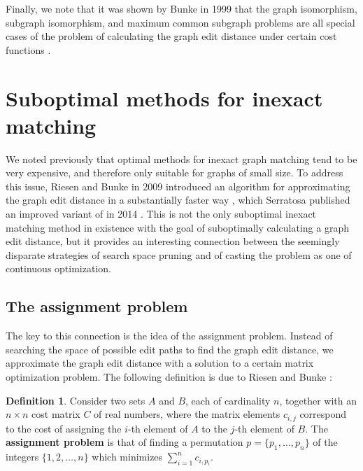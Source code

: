 \documentclass[12pt]{thesis}
\theoremstyle{plain}
\theoremstyle{definition}
\newtheorem{definition}[theorem]{Definition}
\theoremstyle{remark}
\begin{document}
Finally, we note that it was shown by Bunke in 1999 that the graph isomorphism, subgraph isomorphism, and maximum common subgraph problems are all special cases of the problem of calculating the graph edit distance under certain cost functions \cite{Bunke_1999}. 








\section{Suboptimal methods for inexact matching}

We noted previously that optimal methods for inexact graph matching tend to be very expensive, and therefore only suitable for graphs of small size. To address this issue, Riesen and Bunke in 2009 introduced an algorithm for approximating the graph edit distance in a substantially faster way \cite{Riesen_2009}, which Serratosa published an improved variant of in 2014 \cite{Serratosa_2014}. This is not the only suboptimal inexact matching method in existence with the goal of suboptimally calculating a graph edit distance, but it provides an interesting connection between the seemingly disparate strategies of search space pruning and of casting the problem as one of continuous optimization.

\subsection{The assignment problem}

The key to this connection is the idea of the assignment problem. Instead of searching the space of possible edit paths to find the graph edit distance, we approximate the graph edit distance with a solution to a certain matrix optimization problem. The following definition is due to Riesen and Bunke \cite{Riesen_2009}:

\begin{definition}
Consider two sets $A$ and $B$, each of cardinality $n$, together with an $n\times n$ cost matrix $C$ of real numbers, where the matrix elements $c_{i,j}$ correspond to the cost of assigning the $i$-th element of $A$ to the $j$-th element of $B$. The \textbf{assignment problem} is that of finding a permutation $p=\{p_1,\dots,p_n\}$ of the integers $\{1,2,\dots,n\}$ which minimizes $\sum_{i=1}^n c_{i,p_i}$.
\end{definition}
\end{document}
